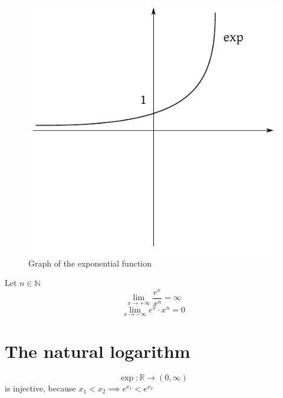 \documentclass[a4paper,landscape,twocolumn]{article}
\theoremstyle{definition}
\begin{document}
\begin{figure}[!h]
  \begin{center}
    \includegraphics{img/exp-graph.pdf}
    \caption{Graph of the exponential function}
  \end{center}
\end{figure}

Let $n \in \mathbb N$
\[ \lim_{x\to+\infty} \frac{e^x}{x^n} = \infty \]
\[ \lim_{x\to-\infty} e^x \cdot x^n = 0 \]

\section{The natural logarithm}
%
\[ \exp: \mathbb R \to (0,\infty) \]
is injective, because $x_1 < x_2 \implies e^{x_1} < e^{x_2}$
\end{document}
